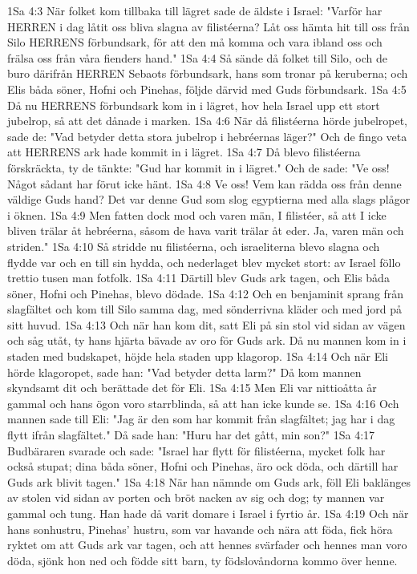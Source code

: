 1Sa 4:3  När folket kom tillbaka till lägret sade de äldste i Israel: "Varför har HERREN i dag låtit oss bliva slagna av filistéerna? Låt oss hämta hit till oss från Silo HERRENS förbundsark, för att den må komma och vara ibland oss och frälsa oss från våra fienders hand."
1Sa 4:4  Så sände då folket till Silo, och de buro därifrån HERREN Sebaots förbundsark, hans som tronar på keruberna; och Elis båda söner, Hofni och Pinehas, följde därvid med Guds förbundsark.
1Sa 4:5  Då nu HERRENS förbundsark kom in i lägret, hov hela Israel upp ett stort jubelrop, så att det dånade i marken.
1Sa 4:6  När då filistéerna hörde jubelropet, sade de: "Vad betyder detta stora jubelrop i hebréernas läger?" Och de fingo veta att HERRENS ark hade kommit in i lägret.
1Sa 4:7  Då blevo filistéerna förskräckta, ty de tänkte: "Gud har kommit in i lägret." Och de sade: "Ve oss! Något sådant har förut icke hänt.
1Sa 4:8  Ve oss! Vem kan rädda oss från denne väldige Guds hand? Det var denne Gud som slog egyptierna med alla slags plågor i öknen.
1Sa 4:9  Men fatten dock mod och varen män, I filistéer, så att I icke bliven trälar åt hebréerna, såsom de hava varit trälar åt eder. Ja, varen män och striden."
1Sa 4:10  Så stridde nu filistéerna, och israeliterna blevo slagna och flydde var och en till sin hydda, och nederlaget blev mycket stort: av Israel föllo trettio tusen man fotfolk.
1Sa 4:11  Därtill blev Guds ark tagen, och Elis båda söner, Hofni och Pinehas, blevo dödade.
1Sa 4:12  Och en benjaminit sprang från slagfältet och kom till Silo samma dag, med sönderrivna kläder och med jord på sitt huvud.
1Sa 4:13  Och när han kom dit, satt Eli på sin stol vid sidan av vägen och såg utåt, ty hans hjärta bävade av oro för Guds ark. Då nu mannen kom in i staden med budskapet, höjde hela staden upp klagorop.
1Sa 4:14  Och när Eli hörde klagoropet, sade han: "Vad betyder detta larm?" Då kom mannen skyndsamt dit och berättade det för Eli.
1Sa 4:15  Men Eli var nittioåtta år gammal och hans ögon voro starrblinda, så att han icke kunde se.
1Sa 4:16  Och mannen sade till Eli: "Jag är den som har kommit från slagfältet; jag har i dag flytt ifrån slagfältet." Då sade han: "Huru har det gått, min son?"
1Sa 4:17  Budbäraren svarade och sade: "Israel har flytt för filistéerna, mycket folk har också stupat; dina båda söner, Hofni och Pinehas, äro ock döda, och därtill har Guds ark blivit tagen."
1Sa 4:18  När han nämnde om Guds ark, föll Eli baklänges av stolen vid sidan av porten och bröt nacken av sig och dog; ty mannen var gammal och tung. Han hade då varit domare i Israel i fyrtio år.
1Sa 4:19  Och när hans sonhustru, Pinehas' hustru, som var havande och nära att föda, fick höra ryktet om att Guds ark var tagen, och att hennes svärfader och hennes man voro döda, sjönk hon ned och födde sitt barn, ty födslovåndorna kommo över henne.
